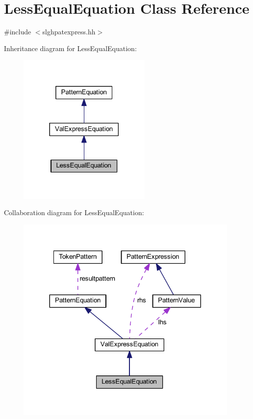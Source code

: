 \hypertarget{class_less_equal_equation}{}\section{Less\+Equal\+Equation Class Reference}
\label{class_less_equal_equation}


{\ttfamily \#include $<$slghpatexpress.\+hh$>$}



Inheritance diagram for Less\+Equal\+Equation\+:
\nopagebreak
\begin{figure}[H]
\begin{center}
\leavevmode
\includegraphics[width=185pt]{class_less_equal_equation__inherit__graph}
\end{center}
\end{figure}


Collaboration diagram for Less\+Equal\+Equation\+:
\nopagebreak
\begin{figure}[H]
\begin{center}
\leavevmode
\includegraphics[width=311pt]{class_less_equal_equation__coll__graph}
\end{center}
\end{figure}

